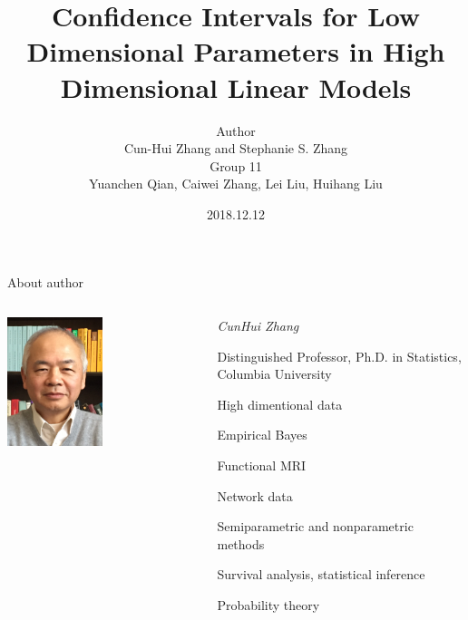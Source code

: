 \title[Low Dimensional Projection]{Confidence Intervals for Low Dimensional Parameters in High Dimensional Linear Models}
\author[Cun-Hui Zhang and Stephanie S. Zhang]{{\scriptsize Author} \\ Cun-Hui Zhang and Stephanie S. Zhang \\ \vspace{1em} {\scriptsize Group 11}\\ Yuanchen Qian, Caiwei Zhang, Lei Liu, Huihang Liu}
\date{2018.12.12}
\maketitle

\begin{frame}{About author}
    \begin{columns}
        \begin{column}{0.5\textwidth}
        \begin{center}
        \includegraphics[width=0.5\textwidth]{./figs/CunHuiZhang.png}
        \end{center}
        \end{column}
        \begin{column}{0.5\textwidth}
        \emph{CunHui Zhang}

        \small
        {\scriptsize Distinguished Professor, Ph.D. in Statistics, Columbia University
        
        \vspace{12pt}
        High dimentional data
        
        Empirical Bayes
        
        Functional MRI
        
        Network data
        
        Semiparametric and nonparametric methods
        
        Survival analysis, statistical inference
        
        Probability theory}
        \end{column}
    \end{columns}
\end{frame}


